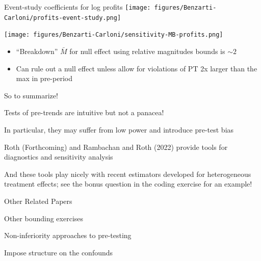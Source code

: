 \documentclass[aspectratio = 169, 13pt]{beamer}
\begin{document}
\begin{frame}{Event-study coefficients for log profits}
	\centering
	\texttt{[image: figures/Benzarti-Carloni/profits-event-study.png]}
\end{frame}

\begin{frame}
	{\centering
		\texttt{[image: figures/Benzarti-Carloni/sensitivity-MB-profits.png]}
	}
	
	\begin{itemize}
		\item
		      ``Breakdown'' $\bar{M}$ for null effect using relative magnitudes bounds is $\sim 2$
		          
		\item
		      Can rule out a null effect unless allow for violations of PT 2x larger than the max in pre-period
		      
	\end{itemize}
	
\end{frame}


\begin{frame}{So to summarize!}
	\begin{wideitemize}
		\item
		Tests of pre-trends are intuitive but not a panacea!
		    
		\item
		In particular, they may suffer from low power and introduce pre-test bias
		    
		\item
		Roth (Forthcoming) and Rambachan and Roth (2022) provide tools for diagnostics and sensitivity analysis
		    
		\item
		And these tools play nicely with recent estimators developed for heterogeneous treatment effects; see the bonus question in the coding exercise for an example!
		    
	\end{wideitemize}
\end{frame}

\begin{frame}{Other Related Papers}
	
	\begin{wideitemize}
		
		\item
		Other bounding exercises \citep{manski_how_2017, ye_negative_2021}
		
		\item
		Non-inferiority approaches to pre-testing \citep{bilinski_no_2018, dette_difference--differences_2020}
		
		\item
		Impose structure on the confounds \citep{freyaldenhoven_pre-event_2019}
	\end{wideitemize}
	    
\end{frame}
\end{document}
